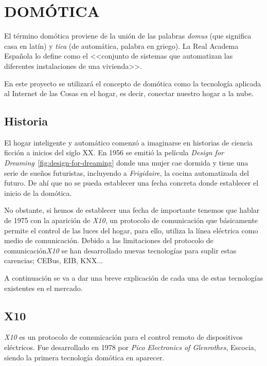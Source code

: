 \section{DOMÓTICA}

El término domótica proviene de la unión de las palabras \emph{domus} (que significa casa en latín) y \emph{tica} (de automática, palabra en griego). La Real Academa Española lo define como el <<conjunto de sistemas que automatizan las diferentes instalaciones de una vivienda>>.

En este proyecto se utilizará el concepto de domótica como la tecnología aplicada al Internet de las Cosas en el hogar, es decir, conectar nuestro hogar a la nube.

\subsection{Historia}


El hogar inteligente y automático comenzó a imaginarse en historias de ciencia ficción a inicios del siglo XX. En 1956 se emitió la película \emph{Design for Dreaming}~\ref{fig:design-for-dreaming} donde una mujer cae dormida y tiene una serie de sueños futuristas, incluyendo a \emph{Frigidaire}, la cocina automatizada del futuro. De ahí que no se pueda establecer una fecha concreta donde establecer el inicio de la domótica.

No obstante, si hemos de establecer una fecha de importante tenemos que hablar de 1975 con la aparición de \emph{X10}, un protocolo de comunicación que básicamente permite el control de las luces del hogar, para ello, utiliza la línea eléctrica como medio de comunicación. Debido a las limitaciones del protocolo de comunicación\emph{X10} se han desarrollado nuevas tecnologías para suplir estas carencias; CEBus, EIB, KNX...

A continuación se va a dar una breve explicación de cada una de estas tecnologías existentes en el mercado.

\subsection{X10}

\emph{X10} es un protocolo de comunicación para el control remoto de dispositivos eléctricos. Fue desarrollado en 1978 por \emph{Pico Electronics of Glenrothes}, Escocia, siendo la primera tecnología domótica en aparecer.

